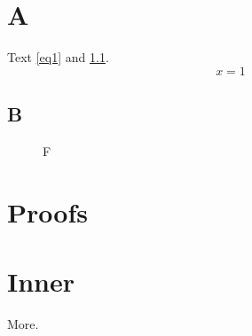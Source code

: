 \documentclass{scrartcl}
\begin{document}
\section{A}
Text \ref{eq1} and \ref{sb}.
\begin{equation}x=1\label{eq1}\end{equation}
\subsection{B}\label{sb}
\begin{figure}\caption{F}\end{figure}
\appendix
\section{Proofs}
\section{Inner}
More.
\end{document}
